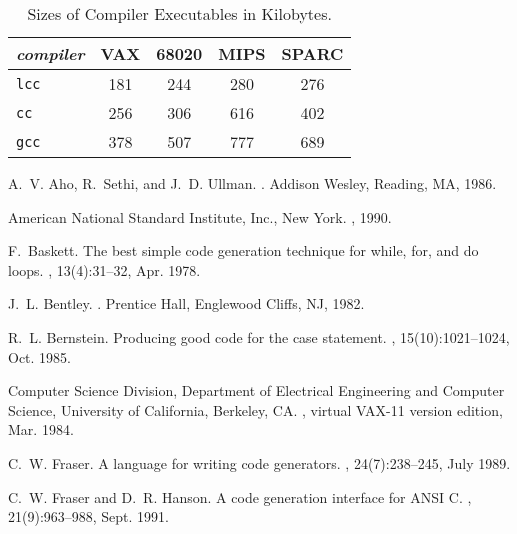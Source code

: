 \begin{table}
\begin{center}
\begin{tabular}{lcccc}
\it compiler	& VAX		& 68020		& MIPS		& SPARC \\ \hline
\tt lcc		& 181		& 244		& 280		& 276 \\ %
\tt cc		& 256		& 306		& 616		& 402 \\
\tt gcc		& 378		& 507		& 777		& 689 \\
\end{tabular}
\end{center}
\caption{Sizes of Compiler Executables in Kilobytes.\label{sizes}}
\end{table}

%
\begin{thebibliography}{10}

A.~V. Aho, R.~Sethi, and J.~D. Ullman.
.
\newblock Addison Wesley, Reading, MA, 1986.

American National Standard Institute, Inc., New York.
, 1990.

F.~Baskett.
\newblock The best simple code generation technique for while, for, and do
  loops.
, 13(4):31--32, Apr. 1978.

J.~L. Bentley.
.
\newblock Prentice Hall, Englewood Cliffs, NJ, 1982.

R.~L. Bernstein.
\newblock Producing good code for the case statement.
, 15(10):1021--1024, Oct.
  1985.

Computer Science Division, Department of Electrical Engineering and Computer
  Science, University of California, Berkeley, CA.
, virtual {VAX}-11 version
  edition, Mar. 1984.

C.~W. Fraser.
\newblock A language for writing code generators.
, 24(7):238--245, July 1989.

C.~W. Fraser and D.~R. Hanson.
\newblock A code generation interface for {ANSI C}.
, 21(9):963--988, Sept. 1991.


\end{thebibliography}
